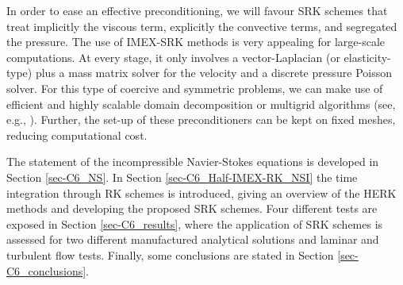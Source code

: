 In order to ease an effective preconditioning, we will favour SRK schemes that treat implicitly the viscous term, explicitly the convective terms, and segregated the pressure. The use of IMEX-SRK methods is very appealing for large-scale computations. At every stage, it only involves a vector-Laplacian (or elasticity-type) plus a mass matrix solver for the velocity and a discrete pressure Poisson solver. For this type of coercive and symmetric problems, we can make use of efficient and highly scalable domain decomposition or multigrid algorithms (see, e.g., \cite{art003}). Further, the set-up of these preconditioners can be kept on fixed meshes, reducing computational cost. 

The statement of the incompressible Navier-Stokes equations is developed in Section \ref{sec-C6_NS}. In Section \ref{sec-C6_Half-IMEX-RK_NSI} the time integration through RK schemes is introduced, giving an overview of the HERK methods and developing the proposed SRK schemes. Four different tests are exposed in Section \ref{sec-C6_results}, where the application of SRK schemes is assessed for two different manufactured analytical solutions and laminar and turbulent flow tests. Finally, some conclusions are stated in Section \ref{sec-C6_conclusions}.


